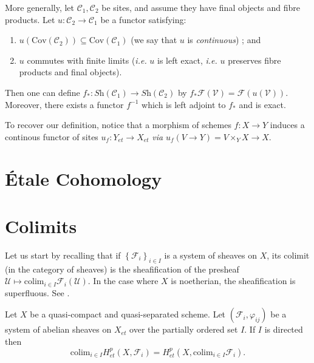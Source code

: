 \begin{remark}
\label{remark-functoriality-general}
More generally, let $\mathcal{C}_1, \mathcal{C}_2$ be sites, and
assume they have final objects and fibre products.  Let
$u: \mathcal{C}_2 \to \mathcal{C}_1$ be a functor satisfying:
\begin{enumerate}
\item $u (\text{Cov}(\mathcal{C}_2)) \subseteq \text{Cov}(\mathcal{C}_1)$ (we 
say that $u$ is {\it continuous}) ; and
\item $u$ commutes with finite limits ({\it i.e.} $u$ is left exact, {\it i.e.} 
$u$ preserves fibre products and final objects).
\end{enumerate}
Then one can define $f_*: \textit{Sh}(\mathcal{C}_1) \to 
\textit{Sh}(\mathcal{C}_2)$ by $ f_* \mathcal{F}(\mathcal{V}) = 
\mathcal{F}(u(\mathcal{V}))$. Moreover, there exists a functor $f^{-1}$ which 
is left adjoint to $f_*$ and is exact.

\medskip\noindent
To recover our definition, notice that a morphism of schemes $ f: X  \to Y$ 
induces a continous functor of sites $u_f: Y_{et} \to X_{et}$ {\it via} $u_f (V 
\to Y) = V \times_Y X \to X$.
\end{remark}






\section{\'Etale Cohomology}
\label{section-etale-cohomology}


\section{Colimits}
\label{section-colimit}

\noindent
Let us start by recalling that if $\left\{\mathcal{F}_i\right\}_{i\in I}$ is a 
system of sheaves on $X$, its colimit (in the category of sheaves) is the 
sheafification of the presheaf $\mathcal{U} \mapsto \text{colim}_{i\in I} 
\mathcal{F}_i(\mathcal{U})$. In the case where $X$ is noetherian, the 
sheafification is superfluous. See \cite{H}.

\begin{theorem}
\label{theorem-colimit}
Let $X$ be a quasi-compact and quasi-separated scheme. Let 
$\left(\mathcal{F}_i, \varphi_{ij}\right)$ be a system of abelian sheaves on 
$X_{et}$ over the partially ordered set $I$. If $I$ is directed then
$$
\text{colim}_{i\in I} H_{et}^p(X, \mathcal{F}_i) = H_{et}^p(X, 
\text{colim}_{i\in I} \mathcal{F}_i).
$$
\end{theorem}


